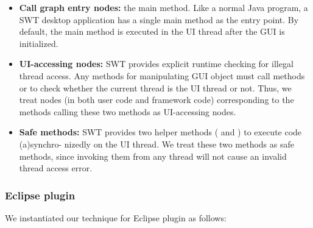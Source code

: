
\begin{itemize}

\item \textbf{Call graph entry nodes: } the main method. Like a normal Java program,
a SWT desktop application has a single main method as the entry point. By default,
the main method is executed in the UI thread after the GUI
is initialized.

\item \textbf{UI-accessing nodes: } SWT provides explicit
runtime checking for illegal thread access. Any methods for manipulating
GUI object must call methods 
or  to check whether the current
thread is the UI thread or not.
Thus, we treat nodes (in both user code and framework code) corresponding to the methods
calling these two methods as UI-accessing nodes.

\item \textbf{Safe methods: } SWT provides two helper methods (
and ) to execute code (a)synchro-
nizedly on the UI thread.
 We treat these two methods as safe methods, since invoking
them from any thread 
will not cause an invalid thread access error.

\end{itemize}

\subsubsection{Eclipse plugin}

We instantiated our technique for Eclipse plugin as follows:


